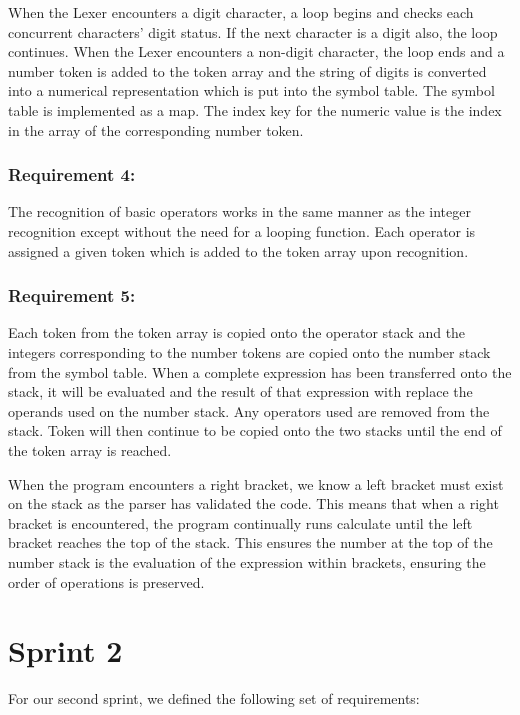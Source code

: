 \documentclass[a4paper, oneside, 11pt]{report}
\begin{document}
When the Lexer encounters a digit character, a loop begins and checks each concurrent characters’ digit status. If the next character is a digit also, the loop continues. When the Lexer encounters a non-digit character, the loop ends and a number token is added to the token array and the string of digits is converted into a numerical representation which is put into the symbol table. The symbol table is implemented as a map. The index key for the numeric value is the index in the array of the corresponding number token. 

\subsubsection{Requirement 4:}

The recognition of basic operators works in the same manner as the integer recognition except without the need for a looping function. Each operator is assigned a given token which is added to the token array upon recognition. 

\subsubsection{Requirement 5:}

Each token from the token array is copied onto the operator stack and the integers corresponding to the number tokens are copied onto the number stack from the symbol table. When a complete expression has been transferred onto the stack, it will be evaluated and the result of that expression with replace the operands used on the number stack. Any operators used are removed from the stack. Token will then continue to be copied onto the two stacks until the end of the token array is reached.  

When the program encounters a right bracket, we know a left bracket must exist on the stack as the parser has validated the code. This means that when a right bracket is encountered, the program continually runs calculate until the left bracket reaches the top of the stack. This ensures the number at the top of the number stack is the evaluation of the expression within brackets, ensuring the order of operations is preserved. 

\section{Sprint 2}

For our second sprint, we defined the following set of requirements: 
\end{document}
